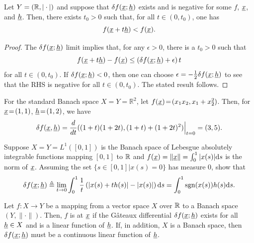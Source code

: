 \begin{lemma}
\label{lemma:gateaux_negative}
Let $Y = (\mathbb{R},|\cdot|)$ and suppose that $\delta f (\underline{x};\underline{h})$ exists and is negative for some $f$, $\underline{x}$, and $\underline{h}$.  Then, there exists $t_0 > 0$ such that, for all $t\in(0,t_0)$, one has
\[ f(\underline{x}+t \underline{h}) < f (\underline{x}). \]
\end{lemma}
\begin{proof}
The $\delta f (\underline{x};\underline{h})$ limit implies that, for any $\epsilon > 0$, there is a $t_0 > 0$ such that
\[ f(\underline{x}+t \underline{h}) - f (\underline{x}) \leq \left( \delta f (\underline{x};\underline{h}) + \epsilon \right)t \]
for all $t\in (0,t_0)$.
If $\delta f (\underline{x};\underline{h})<0$, then one can choose $\epsilon = -\frac{1}{2}\delta f (\underline{x};\underline{h})$ to see that the RHS is negative for all $t\in (0,t_0)$.
The stated result follows.
\end{proof}

\begin{example}
For the standard Banach space $X\!=\!Y\!=\!\mathbb{R}^2$, let $f(\underline{x})\! =\! (x_1 x_2,x_1+x_2^2)$.
Then, for $\underline{x}\!=\!(1,1)$, $\underline{h}\!=\!(1,2)$, we have
\[ \delta f ( \underline{x},\underline{h} ) = \frac{d}{dt} ((1+t)(1+2t),(1+t)+(1+2t)^2) \Big|_{t=0} = (3,5). \]
\end{example}

\begin{problem}
Suppose $X=Y=L^1 ([0,1])$ is the Banach space of Lebesgue absolutely integrable functions mapping $[0,1]$ to $\mathbb{R}$ and $f(\underline{x}) = \| \underline{x} \| = \int_0^1 |x(s)| \mathrm{d} s$ is the norm of $\underline{x}$.
Assuming the set $\{ s\in [0,1] | x(s)=0 \}$ has measure 0, show that
\[ \delta f (\underline{x};\underline{h}) \triangleq \lim_{t \to 0}  \int_0^1 \frac{1}{t} \left( |x(s)+t h(s)| - |x(s)| \right) \mathrm{d} s = \int_0^1 \mathrm{sgn}(x(s)) h(s) \mathrm{d} s. \] 
\end{problem}

\begin{definition}
Let $f \colon X \rightarrow Y$ be a mapping from a vector space $X$ over $\mathbb{R}$ to a Banach space $(Y,\|\cdot\|)$.
Then, $f$ is  at $\underline{x}$ if the G\^{a}teaux differential $\delta f (\underline{x};\underline{h})$ exists for all $\underline{h} \in X$ and is a linear function of $\underline{h}$.
If, in addition, $X$ is a Banach space, then $\delta f (\underline{x};\underline{h})$ must be a continuous linear function of $\underline{h}$.
\end{definition}

